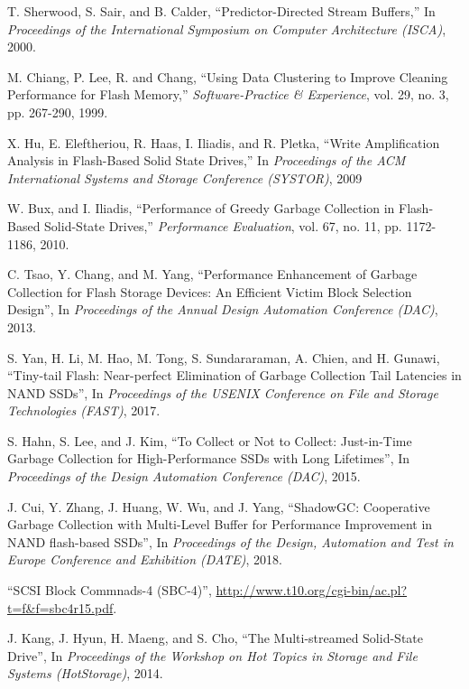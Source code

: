 \begin{thebibliography}{00}
T. Sherwood, S. Sair, and B. Calder,
``Predictor-Directed Stream Buffers,''
In \textit{Proceedings of the International Symposium on Computer Architecture (ISCA)}, 2000.

M. Chiang, P. Lee, R. and Chang,
``Using Data Clustering to Improve Cleaning Performance for Flash Memory,''
\textit{Software-Practice \& Experience}, vol. 29, no. 3, pp. 267-290, 1999.

X. Hu, E. Eleftheriou, R. Haas, I. Iliadis, and R. Pletka,
``Write Amplification Analysis in Flash-Based Solid State Drives,''
In \textit{Proceedings of the ACM International Systems and Storage Conference (SYSTOR)}, 2009

W. Bux, and I. Iliadis,
``Performance of Greedy Garbage Collection in Flash-Based Solid-State Drives,''
\textit{Performance Evaluation}, vol. 67, no. 11, pp. 1172-1186, 2010.

C. Tsao, Y. Chang, and M. Yang,
``Performance Enhancement of Garbage Collection for Flash Storage Devices: 
An Efficient Victim Block Selection Design'',
In \textit{Proceedings of the Annual Design Automation Conference (DAC)}, 2013.

S. Yan, H. Li, M. Hao, M. Tong, S. Sundararaman, A. Chien, and H. Gunawi,
``Tiny-tail Flash: Near-perfect Elimination of Garbage Collection Tail Latencies in NAND SSDs'',
In \textit{Proceedings of the USENIX Conference on File and Storage Technologies (FAST)}, 2017.


S. Hahn, S. Lee, and J. Kim,
``To Collect or Not to Collect: Just-in-Time Garbage Collection for High-Performance SSDs with Long Lifetimes'',
In \textit{Proceedings of the Design Automation Conference (DAC)}, 2015.

J. Cui, Y. Zhang, J. Huang, W. Wu, and J. Yang,
``ShadowGC: Cooperative Garbage Collection with Multi-Level Buffer for Performance Improvement 
in NAND flash-based SSDs'',
In \textit{Proceedings of the Design, Automation and Test in Europe Conference and Exhibition (DATE)}, 2018.

``SCSI Block Commnads-4 (SBC-4)'',
\url{http://www.t10.org/cgi-bin/ac.pl?t=f&f=sbc4r15.pdf}.

J. Kang, J. Hyun, H. Maeng, and S. Cho,
``The Multi-streamed Solid-State Drive'',
In \textit{Proceedings of the Workshop on Hot Topics in Storage and File Systems (HotStorage)}, 2014.


\end{thebibliography}
